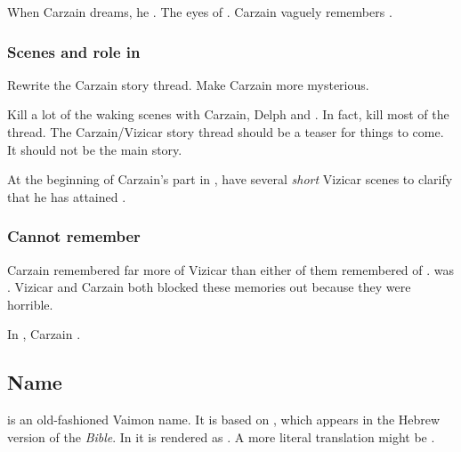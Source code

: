 When Carzain dreams, he . 
The eyes of \Nexagglachel. 
Carzain vaguely remembers . 






\subsubsection{Scenes and role in \TwilightAngelRememberEmph}
Rewrite the Carzain story thread. 
Make Carzain more mysterious. 

Kill a lot of the waking scenes with Carzain, Delph and \Tsekkect. 
In fact, kill most of the thread. 
The Carzain/Vizicar story thread should be a teaser for things to come.
It should not be the main story. 

At the beginning of Carzain's part in \TwilightAngelRememberEmph, have several \emph{short} Vizicar scenes to clarify that he has attained \kenosis. 







\subsubsection{Cannot remember \Tydesmos}
Carzain remembered far more of Vizicar than either of them remembered of \Tydesmos. 
\Tydesmos was .
Vizicar and Carzain both blocked these memories out because they were horrible. 

In \emph{\CarzainWithRedcorBook{}}, Carzain . 









\subsection{Name}
\quo{\Shireyo} is an old-fashioned Vaimon name. 
It is based on , which appears in the Hebrew version of the \emph{Bible}. 
In \cite[Isaiah 14:12]{KingJamesBible} it is rendered as . 
A more literal translation might be .









